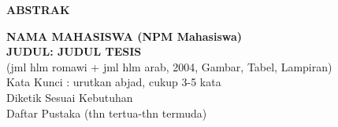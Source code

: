 \newpage %
\begin{center}
\begin{large}\textbf{ABSTRAK}\end{large}
\end{center}
\vspace{5mm} \textbf{NAMA MAHASISWA (NPM Mahasiswa)} \\
\textbf{JUDUL: JUDUL TESIS}
\vspace{1cm}\\
(jml hlm romawi + jml hlm arab, 2004, Gambar, Tabel, Lampiran) \\
Kata Kunci : urutkan abjad, cukup 3-5 kata\\

\noindent Diketik Sesuai Kebutuhan \\
\noindent Daftar Pustaka (thn tertua-thn termuda)